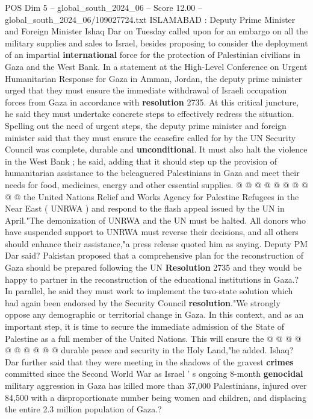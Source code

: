 \begin{textsample}{POS Dim 5 – global\_south\_2024\_06 – Score 12.00 – global\_south\_2024\_06/109027724.txt}  \label{ex:f5_pos_230}
ISLAMABAD : Deputy Prime Minister and Foreign Minister Ishaq Dar on Tuesday called upon for an embargo on all the military supplies and sales to Israel, besides proposing to consider the deployment of an impartial \textbf{international} force for the protection of Palestinian civilians in Gaza and the West Bank.
In a statement at the High-Level Conference on Urgent Humanitarian Response for Gaza in Amman, Jordan, the deputy prime minister urged that they must ensure the immediate withdrawal of Israeli occupation forces from Gaza in accordance with \textbf{resolution} 2735.
At this critical juncture, he said they must undertake concrete steps to effectively redress the situation.
Spelling out the need of urgent steps, the deputy prime minister and foreign minister said that they must ensure the ceasefire called for by the UN Security Council was complete, durable and \textbf{unconditional}.
It must also halt the violence in the West Bank ; he said, adding that it should step up the provision of humanitarian assistance to the beleaguered Palestinians in Gaza and meet their needs for food, medicines, energy and other essential supplies. @ @ @ @ @ @ @ @ @ @ the United Nations Relief and Works Agency for Palestine Refugees in the Near East ( UNRWA ) and respond to the flash appeal issued by the UN in April."The demonization of UNRWA and the UN must be halted.
All donors who have suspended support to UNRWA must reverse their decisions, and all others should enhance their assistance,"a press release quoted him as saying.
Deputy PM Dar said?
Pakistan proposed that a comprehensive plan for the reconstruction of Gaza should be prepared following the UN \textbf{Resolution} 2735 and they would be happy to partner in the reconstruction of the educational institutions in Gaza.?
In parallel, he said they must work to implement the two-state solution which had again been endorsed by the Security Council \textbf{resolution}."We strongly oppose any demographic or territorial change in Gaza.
In this context, and as an important step, it is time to secure the immediate admission of the State of Palestine as a full member of the United Nations.
This will ensure the @ @ @ @ @ @ @ @ @ @ durable peace and security in the Holy Land,"he added.
Ishaq?
Dar further said that they were meeting in the shadows of the gravest \textbf{crimes} committed since the Second World War as Israel ' s ongoing 8-month \textbf{genocidal} military aggression in Gaza has killed more than 37,000 Palestinians, injured over 84,500 with a disproportionate number being women and children, and displacing the entire 2.3 million population of Gaza.?

\end{textsample}
